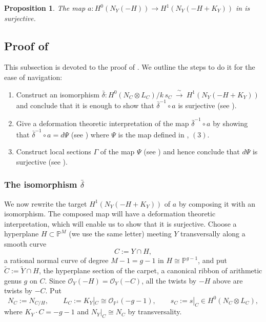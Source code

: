 \documentclass[11pt,twoside]{amsart}
\theoremstyle{plain}
\newtheorem{proposition}[theorem]{Proposition}
\theoremstyle{definition}
\newcommand{\PP}{\mathbb{P}}
\newcommand{\PM}{\mathbb{P}^M}
\newcommand{\OO}{\mathcal{O}}
\newcommand{\Yt}{\widetilde{Y}}
\newcommand{\Ct}{\widetilde{C}}
\newcommand{\NY}{N_{Y}}
\begin{document}
\begin{proposition}\label{surjectivity of a}
The map $a: H^0(\NY(-H)) \to H^1(\NY(-H+K_Y))$ in  is surjective.
\end{proposition}

\subsection{Proof of }

This subsection is devoted to the proof of . We outline the steps to do it for the ease of navigation:

\begin{enumerate}
    \item Construct an isomorphism $\bar\delta\colon H^0(N_C\otimes L_C)/k\,s_C\ \xrightarrow{\ \sim\ }\ H^1(\NY(-H+K_Y))$ and conclude that it is enough to show that $\bar{\delta}^{-1} \circ a$ is surjective (see ).

    \item Give a deformation theoretic interpretation of the map $\bar{\delta}^{-1} \circ a$ by showing that $\bar{\delta}^{-1} \circ a = d\Psi$ (see ) where $\Psi$ is the map defined in , $(3)$.

    \item Construct local sections $\Gamma$ of the map $\Psi$ (see ) and hence conclude that $d\Psi$ is surjective (see ).
\end{enumerate}


\subsubsection{The isomorphism $\bar{\delta}$}\label{isomorphism_delta}
We now rewrite the target $H^1(\NY(-H+K_Y))$ of $a$ by composing it with an isomorphism. The composed map will have a deformation theoretic interpretation, which will enable us to show that it is surjective. Choose a hyperplane $H\subset\PM$ (we use the same letter) meeting $Y$ transversally along a smooth curve
\[
C:=Y\cap H ,
\]
a rational normal curve of degree $M-1=g-1$ in $H\cong\PP^{g-1}$, and put $\Ct:=\Yt\cap H$, the hyperplane section of the carpet, a canonical ribbon of arithmetic genus $g$ on $C$. Since $\OO_Y(-H)=\OO_Y(-C)$, all the twists by $-H$ above are twists by $-C$. Put
\[
N_C:=N_{C/H},\qquad L_C:=K_Y|_C\cong\OO_{\PP^1}(-g-1),\qquad s_C:=s|_C\in H^0(N_C\otimes L_C),
\]
where $K_Y\cdot C=-g-1$ and $N_Y|_C\cong N_C$ by transversality.
\end{document}
